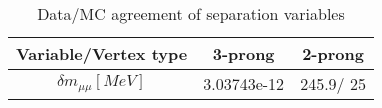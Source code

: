 \documentclass{article}
\begin{document}
\begin{table}[htbp]
\caption{\label{tab:sepVars}Data/MC agreement of separation variables}
\begin{center}
\begin{tabular}{c|c|c}
Variable/Vertex type & 3-prong & 2-prong\\
\hline
$\delta m_{\mu\mu} [MeV]$ & 3.03743e-12 & 245.9/ 25\\
\hline
\end{tabular}
\end{center}
\end{table}
\end{document}
